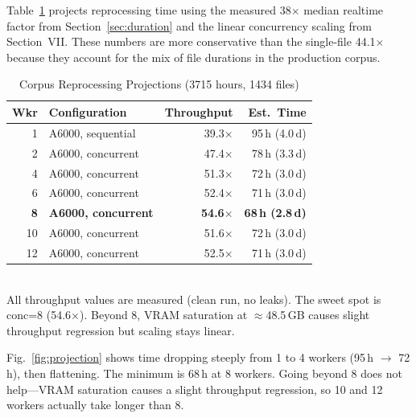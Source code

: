\documentclass[conference,10pt]{IEEEtran}
\begin{document}
Table~\ref{tab:projections} projects reprocessing time using the measured
38$\times$ median realtime factor from Section~\ref{sec:duration} and the
linear concurrency scaling from Section~VII. These numbers are more
conservative than the single-file 44.1$\times$ because they account for the
mix of file durations in the production corpus.

\begin{table}[!t]
\centering
\caption{Corpus Reprocessing Projections (\num{3715} hours, \num{1434} files)}
\label{tab:projections}
\begin{tabular}{@{}rlrr@{}}
\toprule
\textbf{Wkr} & \textbf{Configuration} & \textbf{Throughput} & \textbf{Est.\ Time} \\
\midrule
1  & A6000, sequential     & 39.3$\times$ &  95\,h (4.0\,d) \\
2  & A6000, concurrent     & 47.4$\times$ &  78\,h (3.3\,d) \\
4  & A6000, concurrent     & 51.3$\times$ &  72\,h (3.0\,d) \\
6  & A6000, concurrent     & 52.4$\times$ &  71\,h (3.0\,d) \\
\textbf{8}  & \textbf{A6000, concurrent} & \textbf{54.6$\times$} & \textbf{68\,h (2.8\,d)} \\
10 & A6000, concurrent     & 51.6$\times$ &  72\,h (3.0\,d) \\
12 & A6000, concurrent     & 52.5$\times$ &  71\,h (3.0\,d) \\
\bottomrule
\end{tabular}
\\[4pt]
{\footnotesize All throughput values are measured (clean run, no leaks).
  The sweet spot is conc=8 (54.6$\times$). Beyond 8, VRAM saturation at
  $\approx$48.5\,GB causes slight throughput regression but scaling stays
  linear.}
\end{table}

Fig.~\ref{fig:projection} shows time dropping steeply from 1 to 4 workers
(95\,h $\to$ 72\,h), then flattening. The minimum is 68\,h at 8 workers.
Going beyond 8 does not help---VRAM saturation causes a slight throughput
regression, so 10 and 12 workers actually take longer than 8.
\end{document}
